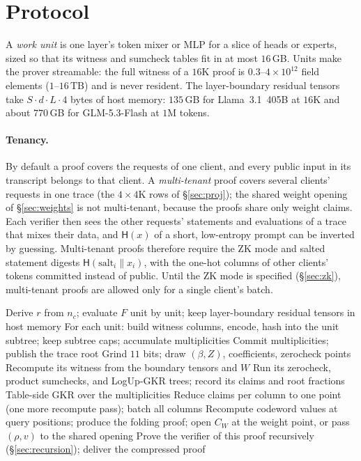 \documentclass[11pt]{article}
\begin{document}
\section{Protocol}
\label{sec:protocol}

A \emph{work unit} is one layer's token mixer or MLP for a slice of heads or experts, sized so that its witness and sumcheck tables fit in at most \(16\)\,GB.
Units make the prover streamable: the full witness of a \(16\)K proof is \(0.3\)--\(4\times 10^{12}\) field elements (\(1\)--\(16\)\,TB) and is never resident.
The layer-boundary residual tensors take \(S \cdot d \cdot L \cdot 4\) bytes of host memory: \(135\)\,GB for Llama~3.1~405B at \(16\)K and about \(770\)\,GB for GLM-5.3-Flash at \(1\)M tokens.

\paragraph{Tenancy.}
By default a proof covers the requests of one client, and every public input in its transcript belongs to that client.
A \emph{multi-tenant} proof covers several clients' requests in one trace (the \(4\times 4\)K rows of \S\ref{sec:proj}); the shared weight opening of \S\ref{sec:weights} is not multi-tenant, because the proofs share only weight claims.
Each verifier then sees the other requests' statements and evaluations of a trace that mixes their data, and \(\mathsf{H}(x)\) of a short, low-entropy prompt can be inverted by guessing.
Multi-tenant proofs therefore require the ZK mode and salted statement digests \(\mathsf{H}(\mathrm{salt}_i \| x_i)\), with the one-hot columns of other clients' tokens committed instead of public.
Until the ZK mode is specified (\S\ref{sec:zk}), multi-tenant proofs are allowed only for a single client's batch.

\begin{algorithm}[h]
\caption{\(\mathsf{Prove}\)}
\begin{algorithmic}[1]
\State Derive \(r\) from \(n_c\); evaluate \(F\) unit by unit; keep layer-boundary residual tensors in host memory
\State For each unit: build witness columns, encode, hash into the unit subtree; keep subtree caps; accumulate multiplicities
\State Commit multiplicities; publish the trace root
\State Grind \(11\) bits; draw \((\beta, Z)\), coefficients, zerocheck points
  \State Recompute its witness from the boundary tensors and \(W\)
  \State Run its zerocheck, product sumchecks, and LogUp-GKR trees; record its claims and root fractions
\EndFor
\State Table-side GKR over the multiplicities
\State Reduce claims per column to one point (one more recompute pass); batch all columns
\State Recompute codeword values at query positions; produce the folding proof; open \(C_W\) at the weight point, or pass \((\rho, v)\) to the shared opening
\State Prove the verifier of this proof recursively (\S\ref{sec:recursion}); deliver the compressed proof
\end{algorithmic}
\end{algorithm}
\end{document}
